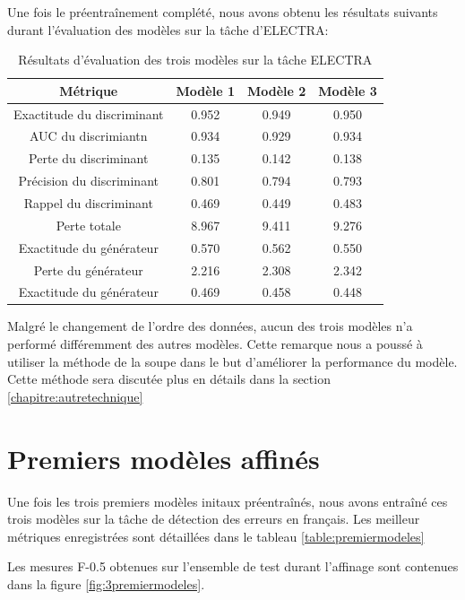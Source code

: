 \documentclass[12pt,twoside,maitrise]{dms}
\theoremstyle{definition}
\numberwithin{equation}{section}
\numberwithin{table}{chapter}
\numberwithin{figure}{chapter}
\begin{document}
Une fois le préentraînement complété, nous avons obtenu les résultats suivants
durant l'évaluation des modèles sur la tâche d'ELECTRA:

\begin{table}[h!]
	\centering
	\begin{tabular}{||c | c c c||}
		\hline
		Métrique                   & Modèle 1 & Modèle 2 & Modèle 3 \\ [0.5ex]
		\hline\hline
		Exactitude du discriminant & 0.952    & 0.949    & 0.950    \\
		AUC du discrimiantn        & 0.934    & 0.929    & 0.934    \\
		Perte du discriminant      & 0.135    & 0.142    & 0.138    \\
		Précision du discriminant  & 0.801    & 0.794    & 0.793    \\
		Rappel du discriminant     & 0.469    & 0.449    & 0.483    \\
		Perte totale               & 8.967    & 9.411    & 9.276    \\
		Exactitude du générateur   & 0.570    & 0.562    & 0.550    \\
		Perte du générateur        & 2.216    & 2.308    & 2.342    \\
		Exactitude du générateur   & 0.469    & 0.458    & 0.448    \\
		\hline
	\end{tabular}
	\caption{Résultats d'évaluation des trois modèles sur la tâche ELECTRA}
	\label{table:respreentrainementsanscasse}
\end{table}
Malgré le changement de l'ordre des données, aucun des trois modèles n'a
performé différemment des autres modèles. Cette remarque nous a poussé à
utiliser la méthode de la soupe \cite{soup} dans le but d'améliorer la
performance du modèle. Cette méthode sera discutée plus en détails dans la
section \ref{chapitre:autretechnique}


\section{Premiers modèles affinés}
Une fois les trois premiers modèles initaux préentraînés, nous avons entraîné
ces trois modèles sur la tâche de détection des erreurs en français. Les
meilleur métriques enregistrées sont détaillées dans le tableau
\ref{table:premiermodeles}

Les mesures F-0.5 obtenues sur l'ensemble de test durant
l'affinage sont contenues dans la figure \ref{fig:3premiermodeles}.
\end{document}
